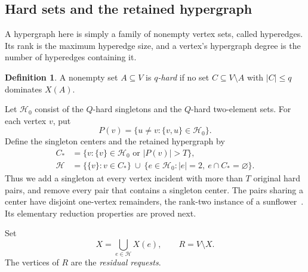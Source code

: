 \documentclass[11pt,a4paper]{article}
\theoremstyle{definition}
\newtheorem{definition}[definition]{Definition}
\theoremstyle{remark}
\newcommand{\HH}{\mathcal H}
\begin{document}
\subsection{Hard sets and the retained hypergraph}

A hypergraph here is simply a family of nonempty vertex sets, called
hyperedges. Its rank is the maximum hyperedge size, and a vertex's
hypergraph degree is the number of hyperedges containing it.


\begin{definition}
A nonempty set \(A\subseteq V\) is \emph{\(q\)-hard} if no set
\(C\subseteq V\setminus A\) with \(|C|\leq q\) dominates \(X(A)\).
\end{definition}

Let \(\HH_0\) consist of the \(Q\)-hard singletons and the \(Q\)-hard
two-element sets. For each vertex \(v\), put
\[
  P(v)=\{u\ne v:\{v,u\}\in\HH_0\}.
\]
Define the singleton centers and the retained hypergraph by
\begin{align}
  C_*&=\{v:\{v\}\in\HH_0\text{ or }|P(v)|>T\},\label{eq:centers}\\
  \HH&=\{\{v\}:v\in C_*\}
   \ \cup\
   \{e\in\HH_0:|e|=2,\ e\cap C_*=\varnothing\}.\label{eq:hypergraph}
\end{align}
Thus we add a singleton at every vertex incident with more than \(T\)
original hard pairs, and remove every pair that contains a singleton
center. The pairs sharing a center have disjoint one-vertex remainders,
the rank-two instance of a sunflower~\cite{ER60}. Its elementary
reduction properties are proved next.

Set
\begin{equation}\label{eq:residual}
  X=\bigcup_{e\in\HH}X(e),\qquad R=V\setminus X.
\end{equation}
The vertices of \(R\) are the \emph{residual requests}.
\end{document}
